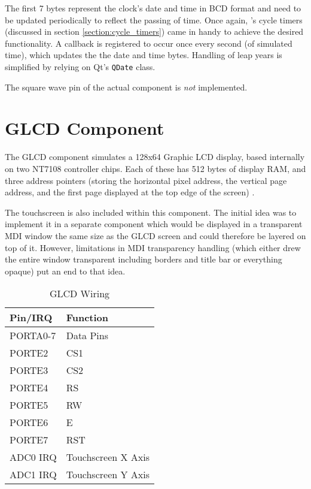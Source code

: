 The first 7 bytes represent the clock's date and time in \ac{BCD} format and need
to be updated periodically to reflect the passing of time. Once again,
\simavr's cycle timers (discussed in section \ref{section:cycle_timers}) came in
handy to achieve the desired functionality. A callback is registered to occur
once every second (of simulated time), which updates the the date
and time bytes. Handling of leap years is simplified by relying on Qt's
\lstinline|QDate| class.

The square wave pin of the actual component is \emph{not} implemented.

\section{\acf{GLCD} Component} \label{section:component_glcd}

The \ac{GLCD} component simulates a 128x64 Graphic \ac{LCD} display, based internally
on two NT7108 controller chips. Each of these has 512 bytes of display \ac{RAM},
and three address pointers (storing the horizontal pixel address, the vertical page
address, and the first page displayed at the top edge of the screen)
\cite{winstar01, samsung01, neotec01}.

The touchscreen is also included within this component. The initial idea was to
implement it in a separate component which would be displayed in a transparent
\ac{MDI} window the same size as the \ac{GLCD} screen and could therefore be
layered on top of it. However, limitations in \ac{MDI} transparency handling
(which either drew the entire window transparent including borders and title bar
or everything opaque) put an end to that idea.

\begin{table}[ht]
\centering
\begin{tabular}{l|l}

Pin/\ac{IRQ}        & Function \\

\hline

PORTA0-7            & Data Pins\\
PORTE2              & \acf{CS1}\\
PORTE3              & \acf{CS2}\\
PORTE4              & \acf{RS}\\
PORTE5              & \acf{RW}\\
PORTE6              & \acf{E}\\
PORTE7              & \acf{RST}\\
\ac{ADC}0 \ac{IRQ}  & Touchscreen X Axis\\
\ac{ADC}1 \ac{IRQ}  & Touchscreen Y Axis

\end{tabular}
\caption{\ac{GLCD} Wiring}
\label{tab:wiring_glcd}
\end{table}


